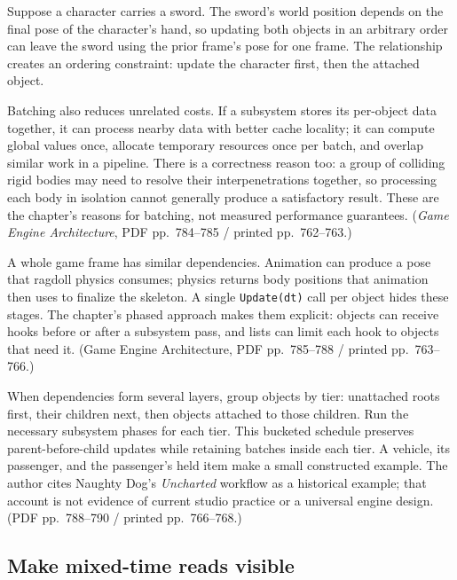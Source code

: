 \hypertarget{05-engine-i-ch014-let-dependencies-set-the-update-order}{}

Suppose a character carries a sword. The sword's world position depends on the final pose of the character's hand, so updating both objects in an arbitrary order can leave the sword using the prior frame's pose for one frame. The relationship creates an ordering constraint: update the character first, then the attached object.

Batching also reduces unrelated costs. If a subsystem stores its per-object data together, it can process nearby data with better cache locality; it can compute global values once, allocate temporary resources once per batch, and overlap similar work in a pipeline. There is a correctness reason too: a group of colliding rigid bodies may need to resolve their interpenetrations together, so processing each body in isolation cannot generally produce a satisfactory result. These are the chapter's reasons for batching, not measured performance guarantees. (\emph{Game Engine Architecture}, PDF pp.~784--785 / printed pp.~762--763.)

A whole game frame has similar dependencies. Animation can produce a pose that ragdoll physics consumes; physics returns body positions that animation then uses to finalize the skeleton. A single \texttt{Update(dt)} call per object hides these stages. The chapter's phased approach makes them explicit: objects can receive hooks before or after a subsystem pass, and lists can limit each hook to objects that need it. (Game Engine Architecture, PDF pp.~785--788 / printed pp.~763--766.)

When dependencies form several layers, group objects by tier: unattached roots first, their children next, then objects attached to those children. Run the necessary subsystem phases for each tier. This bucketed schedule preserves parent-before-child updates while retaining batches inside each tier. A vehicle, its passenger, and the passenger's held item make a small constructed example. The author cites Naughty Dog's \emph{Uncharted} workflow as a historical example; that account is not evidence of current studio practice or a universal engine design. (PDF pp.~788--790 / printed pp.~766--768.)

\subsection{Make mixed-time reads visible}\label{05-engine-i-ch014-make-mixed-time-reads-visible}

